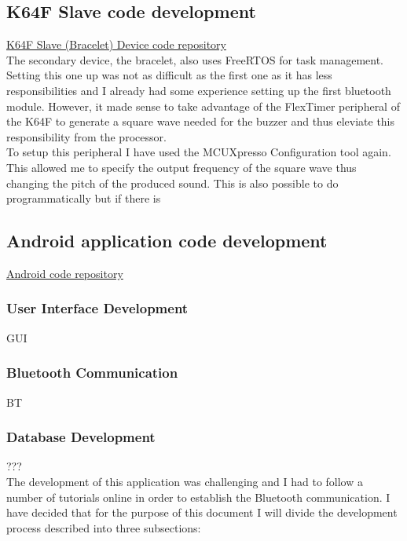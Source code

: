\documentclass[12pt,a4paper]{article}
\begin{document}
   \subsection{K64F Slave code development}
   \href{https://github.com/zedd-1983/project_dev2/tree/Bluetooth}{K64F Slave (Bracelet) Device code repository}\\
   The secondary device, the bracelet, also uses FreeRTOS for task management. Setting this one up was not as difficult as the first one as it has less responsibilities and I already had some experience setting up the first bluetooth module. However, it made sense to take advantage of the FlexTimer peripheral of the K64F to generate a square wave needed for the buzzer and thus eleviate this responsibility from the processor.\\
               
   To setup this peripheral I have used the MCUXpresso Configuration tool again. This allowed me to specify the output frequency of the square wave thus changing the pitch of the produced sound. This is also possible to do programmatically but if there is 
               
   \subsection{Android application code development}
   \href{https://github.com/zedd-1983/Easysleep_app/tree/bt_connection_3}{Android code repository}\\
               
   \subsubsection{User Interface Development}
   GUI\\
   \subsubsection{Bluetooth Communication}
   BT\\
   \subsubsection{Database Development}
   ???\\
               
   The development of this application was challenging and I had to follow a number of tutorials online in order to establish the Bluetooth communication. I have decided that for the purpose of this document I will divide the development process described into three subsections:  
               
\end{document}
